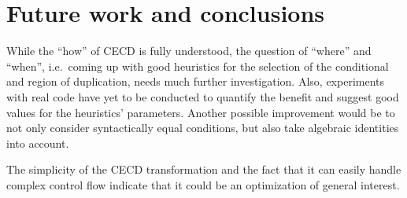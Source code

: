 \documentclass[halfparskip]{scrartcl}
\begin{document}
\section{Future work and conclusions}

While the “how” of CECD is fully understood, the question of “where” and “when”, i.e.\ coming up with good heuristics for the selection of the conditional and region of duplication, needs much further investigation. Also, experiments with real code have yet to be conducted to quantify the benefit and suggest good values for the heuristics’ parameters. Another possible improvement would be to not only consider syntactically equal conditions, but also take algebraic identities into account.

The simplicity of the CECD transformation and the fact that it can easily handle complex control flow indicate that it could be an optimization of general interest.



\end{document}
